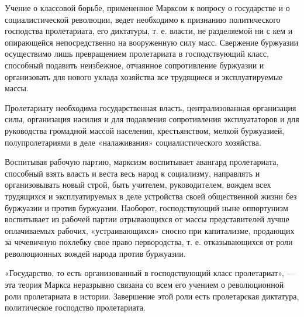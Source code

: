 \documentclass[12pt]{article}
\newcommand{\parnum}{(\arabic{parcount})}
\newcounter{parcount}
\newenvironment{parnumbers}{%
  \par%
  \everypar{\noindent \stepcounter{parcount}\marginpar[]{\parnum}}%
}{}
\begin{document}
\begin{parnumbers}
Учение о классовой борьбе, примененное Марксом к вопросу о государстве и о социалистической революции, ведет необходимо к признанию политического господства пролетариата, его диктатуры, т. е. власти, не разделяемой ни с кем и опирающейся непосредственно на вооруженную силу масс. Свержение буржуазии осуществимо лишь превращением пролетариата в господствующий класс, способный подавить неизбежное, отчаянное сопротивление буржуазии и организовать для нового уклада хозяйства все трудящиеся и эксплуатируемые массы.

Пролетариату необходима государственная власть, централизованная организация силы, организация насилия и для подавления сопротивления эксплуататоров и для руководства громадной массой населения, крестьянством, мелкой буржуазией, полупролетариями в деле «налаживания» социалистического хозяйства.

Воспитывая рабочую партию, марксизм воспитывает авангард пролетариата, способный взять власть и веста весь народ к социализму, направлять и организовывать новый строй, быть учителем, руководителем, вождем всех трудящихся и эксплуатируемых в деле устройства своей общественной жизни без буржуазии и против буржуазии. Наоборот, господствующий ныне оппортунизм воспитывает из рабочей партии отрывающихся от массы представителей лучше оплачиваемых рабочих, «устраивающихся» сносно при капитализме, продающих за чечевичную похлебку свое право первородства, т. е. отказывающихся от роли революционных вождей народа против буржуазии.

«Государство, то есть организованный в господствующий класс пролетариат», — эта теория Маркса неразрывно связана со всем его учением о революционной роли пролетариата в истории. Завершение этой роли есть пролетарская диктатура, политическое господство пролетариата.
\end{parnumbers}
\end{document}
